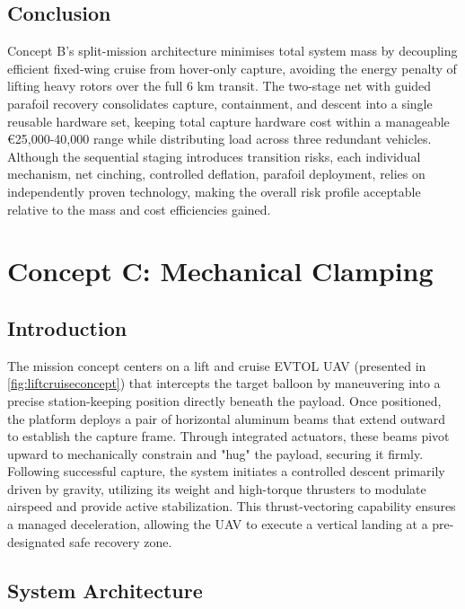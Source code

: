 \subsection{Conclusion}
Concept B's split-mission architecture minimises total system mass by decoupling efficient fixed-wing cruise from hover-only capture, avoiding the energy penalty of lifting heavy rotors over the full 6 km transit. The two-stage net with guided parafoil recovery consolidates capture, containment, and descent into a single reusable hardware set, keeping total capture hardware cost within a manageable €25,000-40,000 range while distributing load across three redundant vehicles. Although the sequential staging introduces transition risks, each individual mechanism, net cinching, controlled deflation, parafoil deployment, relies on independently proven technology, making the overall risk profile acceptable relative to the mass and cost efficiencies gained.

\section{Concept C: Mechanical Clamping}
\subsection{Introduction}
The mission concept  centers on a lift and cruise EVTOL UAV (presented in \autoref{fig:liftcruiseconcept}) that intercepts the target balloon by maneuvering into a precise station-keeping position directly beneath the payload. Once positioned, the platform deploys a pair of horizontal aluminum beams that extend outward to establish the capture frame. Through integrated actuators, these beams pivot upward to mechanically constrain and "hug" the payload, securing it firmly. Following successful capture, the system initiates a controlled descent primarily driven by gravity, utilizing its weight and high-torque thrusters to modulate airspeed and provide active stabilization. This thrust-vectoring capability ensures a managed deceleration, allowing the UAV to execute a vertical landing at a pre-designated safe recovery zone.

\subsection{System Architecture}
\noindent 


